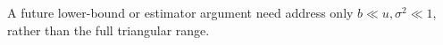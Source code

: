 A future lower-bound or estimator argument need address only \(b\ll u,\sigma^2\ll1\), rather than the full triangular range.
